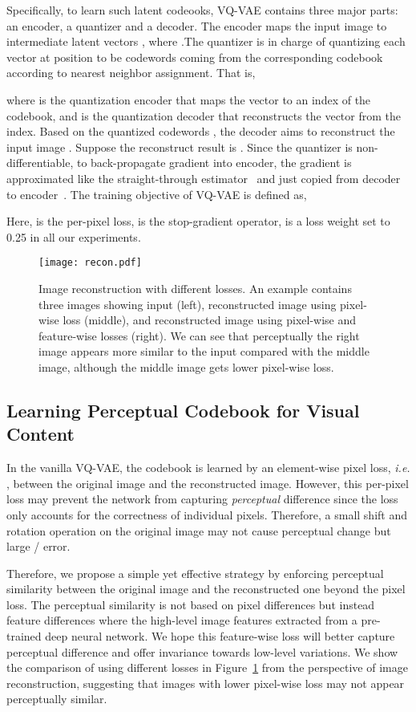 \documentclass[letterpaper]{article} \usepackage{aaai23}  \usepackage{times}  \usepackage{helvet}  \usepackage{courier}  \usepackage[hyphens]{url}  \usepackage{graphicx} \urlstyle{rm} \def\UrlFont{\rm}  \usepackage{natbib}  \usepackage{caption} \frenchspacing  \setlength{\pdfpagewidth}{8.5in}  \setlength{\pdfpageheight}{11in}  \usepackage{algorithm}
\newcommand{\ie}{\textit{i.e. }}
\begin{document}
Specifically, to learn such latent codeooks, VQ-VAE contains three major parts: an encoder,
a quantizer and a decoder.
The encoder maps the input image to intermediate latent vectors ,
 where .The quantizer is in charge of
quantizing each vector at position  to be codewords coming from the corresponding codebook  according to nearest neighbor assignment.
That is,

 
where  is the quantization encoder that maps the vector to an index of the codebook,
and  is the quantization decoder that reconstructs the vector from the index.
Based on the quantized codewords , the decoder aims to reconstruct the input image . Suppose the reconstruct result is . Since the quantizer is non-differentiable, to back-propagate gradient into encoder, the gradient is
approximated like the straight-through estimator~\cite{bengio2013estimating} and just copied from decoder to encoder~\cite{oord2017neural}. The training objective of VQ-VAE is defined as,

Here,  is the per-pixel loss,  is the stop-gradient operator,  is a loss weight set to 0.25 in all our experiments.



\begin{figure}[t]\centering
\texttt{[image: recon.pdf]}
\caption{Image reconstruction with different losses. An example contains three images showing input (left), reconstructed image using pixel-wise loss (middle), and
reconstructed image using pixel-wise and feature-wise losses (right). We can see that perceptually the right image appears more similar to the input compared with the middle image, although the middle image gets lower pixel-wise loss.}
\label{fig:recons_comparison}
\end{figure}


\subsection{Learning Perceptual Codebook for Visual Content}
In the vanilla VQ-VAE, the codebook is learned by an element-wise pixel loss, \ie , between the original image and the reconstructed image. However, this per-pixel loss may prevent the network from capturing \emph{perceptual} difference since the loss only accounts for the correctness of individual pixels. Therefore, a small shift and rotation operation on the original image may not cause perceptual change but large / error. 


Therefore, we propose a simple yet effective strategy by enforcing perceptual similarity between the original image and the reconstructed one beyond the pixel loss.
The perceptual similarity is not based on pixel differences but instead feature differences where the high-level image features extracted from a pre-trained deep neural network. 
We hope this feature-wise loss will better capture perceptual difference and offer invariance towards low-level variations.
We show the comparison of using different losses in Figure~\ref{fig:recons_comparison} from the perspective of image reconstruction, suggesting that images with lower pixel-wise loss may not appear perceptually similar. 
\end{document}
